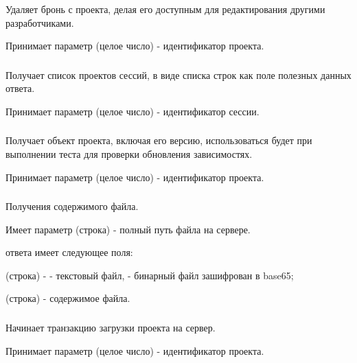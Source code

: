 Удаляет бронь с проекта, делая его доступным для редактирования другими разработчиками.

Принимает параметр  (целое число) - идентификатор проекта.

\subsubsection{}

Получает список проектов сессий, в виде списка строк как поле  полезных данных ответа.

Принимает параметр  (целое число) - идентификатор сессии.

\subsubsection{}

Получает объект проекта, включая его версию, использоваться будет при выполнении теста для проверки обновления зависимостях.

Принимает параметр  (целое число) - идентификатор проекта.

\subsubsection{}

Получения содержимого файла.

Имеет параметр  (строка) - полный путь файла на сервере.
 
 ответа имеет следующее поля:

\begin{icItems}
	\item {} (строка) -  - текстовый файл,  - бинарный файл зашифрован в base65;
	\item {} (строка) - содержимое файла.
\end{icItems}

\subsubsection{}

Начинает транзакцию загрузки проекта на сервер.

Принимает параметр  (целое число) - идентификатор проекта.

